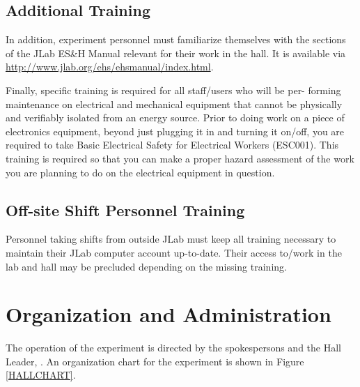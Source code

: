\documentclass[11pt]{article}
\begin{document}
\subsection{Additional Training}
In addition, experiment personnel must familiarize themselves with the 
sections of the JLab ES\&H Manual relevant for their work in the hall.  It is
available via \url{http://www.jlab.org/ehs/ehsmanual/index.html}.

Finally, specific training is required for all staff/users who will be per- forming maintenance on electrical and 
mechanical equipment that cannot be physically and verifiably isolated from an energy source. Prior to 
doing work on a piece of electronics equipment, beyond just plugging it in and turning it on/off, you are 
required to take Basic Electrical Safety for Electrical Workers (ESC001). This training is required so 
that you can make a proper hazard assessment of the work you are planning to do on the electrical 
equipment in question.


\subsection{Off-site Shift Personnel Training}

Personnel taking shifts from outside JLab must keep all training necessary to maintain their JLab computer 
account up-to-date. Their access to/work in the lab and hall may be precluded depending on the missing training.

\section{ Organization  and Administration}
\indent

The operation of the experiment is directed by the spokespersons and the Hall 
Leader, \HALLLEADER. An organization chart for the experiment is
shown in Figure \ref{HALLCHART}.
\end{document}

